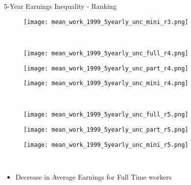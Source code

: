 \documentclass[hyperref={bookmarks=false}]{beamer}
\begin{document}
\begin{appendix}
\begin{frame}{5-Year Earnings Inequality - Ranking}
\begin{figure}[!t]
\begin{minipage}[b]{0.15\textwidth}{}
\centering
\texttt{[image: mean\_work\_1999\_5yearly\_unc\_mini\_r3.png]}
\end{minipage}\\
\begin{minipage}[b]{0.15\textwidth}{}
\centering
\texttt{[image: mean\_work\_1999\_5yearly\_unc\_full\_r4.png]}
\end{minipage}
\begin{minipage}[b]{0.15\textwidth}{}
\centering
\texttt{[image: mean\_work\_1999\_5yearly\_unc\_part\_r4.png]}
\end{minipage}
\begin{minipage}[b]{0.15\textwidth}{}
\centering
\texttt{[image: mean\_work\_1999\_5yearly\_unc\_mini\_r4.png]}
\end{minipage}\\
\begin{minipage}[b]{0.15\textwidth}{}
\centering
\texttt{[image: mean\_work\_1999\_5yearly\_unc\_full\_r5.png]}
\end{minipage}
\begin{minipage}[b]{0.15\textwidth}{}
\centering
\texttt{[image: mean\_work\_1999\_5yearly\_unc\_part\_r5.png]}
\end{minipage}
\begin{minipage}[b]{0.15\textwidth}{}
\centering
\texttt{[image: mean\_work\_1999\_5yearly\_unc\_mini\_r5.png]}
\end{minipage}\\
\end{figure}
\begin{itemize}
\item Decrease in Average Earnings for Full Time workers
\end{itemize}
\end{frame}


\end{appendix}
\end{document}
